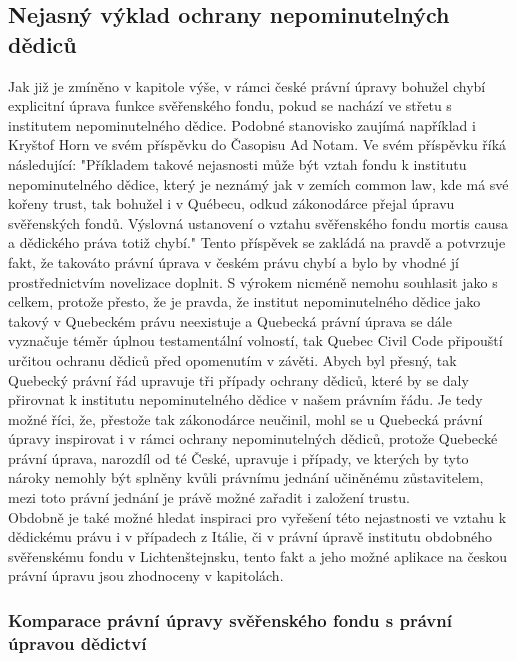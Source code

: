 \documentclass{article}
\begin{document}
\subsection{Nejasný výklad ochrany nepominutelných dědiců}

Jak již je zmíněno v kapitole výše, v rámci české právní úpravy bohužel chybí explicitní úprava funkce svěřenského fondu, pokud se nachází ve střetu s institutem nepominutelného dědice. Podobné stanovisko zaujímá například i Kryštof Horn ve svém příspěvku do Časopisu Ad Notam. Ve svém příspěvku říká následující: "Příkladem takové nejasnosti může být vztah fondu k institutu nepominutelného dědice, který je neznámý jak v zemích common law, kde má své kořeny trust, tak bohužel i v Québecu, odkud zákonodárce přejal úpravu svěřenských fondů. Výslovná ustanovení o vztahu svěřenského fondu mortis causa a dědického práva totiž chybí."  Tento příspěvek se zakládá na pravdě a potvrzuje fakt, že takováto právní úprava v českém právu chybí a bylo by vhodné jí prostřednictvím novelizace doplnit. S výrokem nicméně nemohu souhlasit jako s celkem, protože přesto, že je pravda, že institut nepominutelného dědice jako takový v Quebeckém právu neexistuje a Quebecká právní úprava se dále vyznačuje téměr úplnou testamentální volností, tak Quebec Civil Code připouští určitou ochranu dědiců před opomenutím v závěti. Abych byl přesný, tak Quebecký právní řád upravuje tři případy ochrany dědiců, které by se daly přirovnat k institutu nepominutelného dědice v našem právním řádu. Je tedy možné říci, že, přestože tak zákonodárce neučinil, mohl se u Quebecká právní úpravy inspirovat i v rámci ochrany nepominutelných dědiců, protože Quebecké právní úprava, narozdíl od té České, upravuje i případy, ve kterých by tyto nároky nemohly být splněny kvůli právnímu jednání učiněnému zůstavitelem, mezi toto právní jednání je právě možné zařadit i založení trustu. \\

Obdobně je také možné hledat inspiraci pro vyřešení této nejastnosti ve vztahu k dědickému právu i v případech z Itálie, či v právní úpravě institutu obdobného svěřenskému fondu v Lichtenštejnsku, tento fakt a jeho možné aplikace na českou právní úpravu jsou zhodnoceny v kapitolách. \\

\subsubsection{Komparace právní úpravy svěřenského fondu s právní úpravou dědictví}
\end{document}
